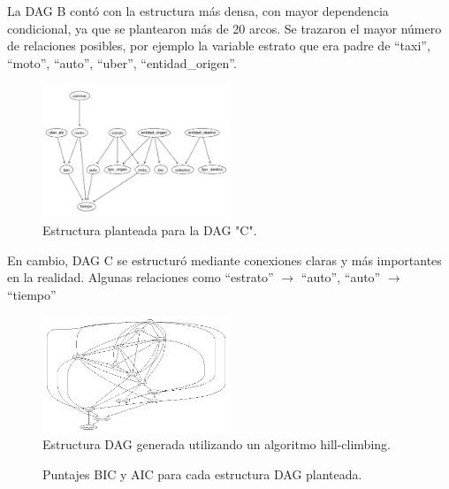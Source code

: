 \documentclass[eng]{ajceam-class}
\begin{document}
La DAG B contó con la estructura más densa, con mayor dependencia condicional, ya que se plantearon más de 20 arcos. Se trazaron el mayor número de relaciones posibles, por ejemplo la variable estrato que era padre de “taxi”, “moto”, “auto”, “uber”, “entidad\_origen”. 

\begin{figure}[H] %
    \centering
    \includegraphics[width=0.5\textwidth]{DAG_c.png}
    \caption{Estructura planteada para la DAG "C".}
\end{figure}

En cambio, DAG C se estructuró mediante conexiones claras y más importantes en la realidad. Algunas relaciones como “estrato” $\to$ “auto”, “auto” $\to$ “tiempo”

\begin{figure}[H] %
    \centering
    \includegraphics[width=0.5\textwidth]{dag_hc.png}
    \caption{Estructura DAG generada utilizando un algoritmo hill-climbing.}
\end{figure}

\begin{figure}[h!]
\centering
{}
\caption{Puntajes BIC y AIC para cada estructura DAG planteada.}
\label{fig:tabla_top10}
\end{figure}
\end{document}
